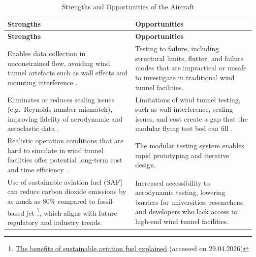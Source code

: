 \begin{longtable}{|p{}|p{}|}
\caption{Strengths and Opportunities of the Aircraft}
\label{tab:SO} \\

\hline
\rowcolor[HTML]{ABE7F3}
\textbf{Strengths} & \textbf{Opportunities} \\ \hline
\endfirsthead

\hline
\rowcolor[HTML]{ABE7F3}
\textbf{Strengths} & \textbf{Opportunities} \\ \hline
\endhead

Enables data collection in unconstrained flow, avoiding wind tunnel artefacts such as wall effects and mounting interference \cite{Castro2026}.
&
Testing to failure, including structural limits, flutter, and failure modes that are impractical or unsafe to investigate in traditional wind tunnel facilities.
\\ \hline

\rowcolor[HTML]{ECF4FF}
Eliminates or reduces scaling issues (e.g.\ Reynolds number mismatch), improving fidelity of aerodynamic and aeroelastic data \cite{Castro2026}.
&
Limitations of wind tunnel testing, such as wall interference, scaling issues, and cost create a gap that the modular flying test bed can fill \cite{Castro2026}.
\\ \hline

Realistic operation conditions that are hard to simulate in wind tunnel facilities offer potential long-term cost and time efficiency \cite{article}.
&
The modular testing system enables rapid prototyping and iterative design.
\\ \hline

\rowcolor[HTML]{ECF4FF}
Use of sustainable aviation fuel (SAF) can reduce carbon dioxide emissions by as much as 80\% compared to fossil-based jet \footnote{\href{https://www.carbonclick.com/news-views/the-benefits-of-sustainable-aviation-fuel-explained}{The benefits of sustainable aviation fuel explained} (accessed on 29.04.2026)}, which aligns with future regulatory and industry trends.
&
Increased accessibility to aerodynamic testing, lowering barriers for universities, researchers, and developers who lack access to high-end wind tunnel facilities.
\\ \hline


\end{longtable}
